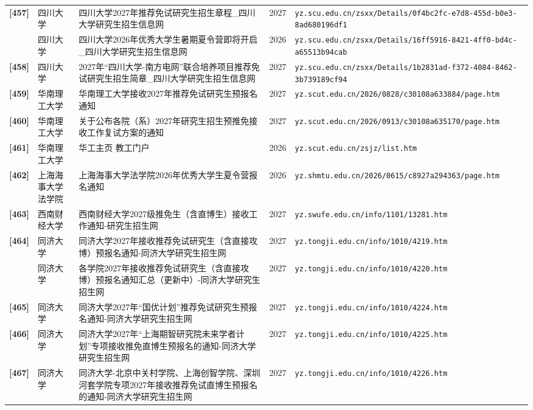 {\begin{longtable}{@{}p{1.15cm}p{2.9cm}p{6.3cm}p{0.85cm}p{5.0cm}@{}}
\textbf{[457]} & 四川大学 & 四川大学2027年推荐免试研究生招生章程\_四川大学研究生招生信息网 & 2027 & \texttt{yz.scu.edu.cn/zsxx/Details/0f4bc2fc-e7d8-455d-b0e3-8ad680196df1} \\
[0] & 四川大学 & 四川大学2026年优秀大学生暑期夏令营即将开启\_四川大学研究生招生信息网 & 2026 & \texttt{yz.scu.edu.cn/zsxx/Details/16ff5916-8421-4ff0-bd4c-a65513b94cab} \\
\textbf{[458]} & 四川大学 & 2027年“四川大学-南方电网”联合培养项目推荐免试研究生招生简章\_四川大学研究生招生信息网 & 2027 & \texttt{yz.scu.edu.cn/zsxx/Details/1b2831ad-f372-4084-8462-3b739189cf94} \\
\textbf{[459]} & 华南理工大学 & 华南理工大学接收2027年推荐免试研究生预报名通知 & 2027 & \texttt{yz.scut.edu.cn/2026/0828/c30108a633884/page.htm} \\
\textbf{[460]} & 华南理工大学 & 关于公布各院（系）2027年研究生招生预推免接收工作复试方案的通知 & 2027 & \texttt{yz.scut.edu.cn/2026/0913/c30108a635170/page.htm} \\
\textbf{[461]} & 华南理工大学 & 华工主页 教工门户 & 2026 & \texttt{yz.scut.edu.cn/zsjz/list.htm} \\
\textbf{[462]} & 上海海事大学法学院 & 上海海事大学法学院2026年优秀大学生夏令营报名通知 & 2026 & \texttt{yz.shmtu.edu.cn/2026/0615/c8927a294363/page.htm} \\
\textbf{[463]} & 西南财经大学 & 西南财经大学2027级推免生（含直博生）接收工作通知-研究生招生网 & 2027 & \texttt{yz.swufe.edu.cn/info/1101/13281.htm} \\
\textbf{[464]} & 同济大学 & 同济大学2027年接收推荐免试研究生（含直接攻博）预报名通知-同济大学研究生招生网 & 2027 & \texttt{yz.tongji.edu.cn/info/1010/4219.htm} \\
[0] & 同济大学 & 各学院2027年接收推荐免试研究生（含直接攻博）预报名通知汇总（更新中）-同济大学研究生招生网 & 2027 & \texttt{yz.tongji.edu.cn/info/1010/4220.htm} \\
\textbf{[465]} & 同济大学 & 同济大学2027年“国优计划”推荐免试研究生预报名通知-同济大学研究生招生网 & 2027 & \texttt{yz.tongji.edu.cn/info/1010/4224.htm} \\
\textbf{[466]} & 同济大学 & 同济大学2027年“上海期智研究院未来学者计划”专项接收推免直博生预报名的通知-同济大学研究生招生网 & 2027 & \texttt{yz.tongji.edu.cn/info/1010/4225.htm} \\
\textbf{[467]} & 同济大学 & 同济大学-北京中关村学院、上海创智学院、深圳河套学院专项2027年接收推荐免试直博生预报名的通知-同济大学研究生招生网 & 2027 & \texttt{yz.tongji.edu.cn/info/1010/4226.htm} \\

\end{longtable}}
